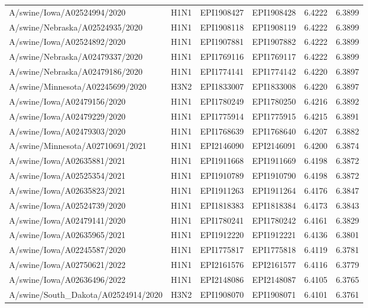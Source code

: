 \begin{tabular}{L{1.95in}|L{.25in}|L{.60in}|L{.6in}|C{1in}|C{1in}}
A/swine/Iowa/A02524994/2020&H1N1&EPI1908427&EPI1908428&6.4222&6.3899\\
A/swine/Nebraska/A02524935/2020&H1N1&EPI1908118&EPI1908119&6.4222&6.3899\\
A/swine/Iowa/A02524892/2020&H1N1&EPI1907881&EPI1907882&6.4222&6.3899\\
A/swine/Nebraska/A02479337/2020&H1N1&EPI1769116&EPI1769117&6.4222&6.3899\\
A/swine/Nebraska/A02479186/2020&H1N1&EPI1774141&EPI1774142&6.4220&6.3897\\
A/swine/Minnesota/A02245699/2020&H3N2&EPI1833007&EPI1833008&6.4220&6.3897\\
A/swine/Iowa/A02479156/2020&H1N1&EPI1780249&EPI1780250&6.4216&6.3892\\
A/swine/Iowa/A02479229/2020&H1N1&EPI1775914&EPI1775915&6.4215&6.3891\\
A/swine/Iowa/A02479303/2020&H1N1&EPI1768639&EPI1768640&6.4207&6.3882\\
A/swine/Minnesota/A02710691/2021&H1N1&EPI2146090&EPI2146091&6.4200&6.3874\\
A/swine/Iowa/A02635881/2021&H1N1&EPI1911668&EPI1911669&6.4198&6.3872\\
A/swine/Iowa/A02525354/2021&H1N1&EPI1910789&EPI1910790&6.4198&6.3872\\
A/swine/Iowa/A02635823/2021&H1N1&EPI1911263&EPI1911264&6.4176&6.3847\\
A/swine/Iowa/A02524739/2020&H1N1&EPI1818383&EPI1818384&6.4173&6.3843\\
A/swine/Iowa/A02479141/2020&H1N1&EPI1780241&EPI1780242&6.4161&6.3829\\
A/swine/Iowa/A02635965/2021&H1N1&EPI1912220&EPI1912221&6.4136&6.3801\\
A/swine/Iowa/A02245587/2020&H1N1&EPI1775817&EPI1775818&6.4119&6.3781\\
A/swine/Iowa/A02750621/2022&H1N1&EPI2161576&EPI2161577&6.4116&6.3779\\
A/swine/Iowa/A02636496/2022&H1N1&EPI2148086&EPI2148087&6.4105&6.3765\\
A/swine/South\_Dakota/A02524914/2020&H3N2&EPI1908070&EPI1908071&6.4101&6.3761\\

\end{tabular}
